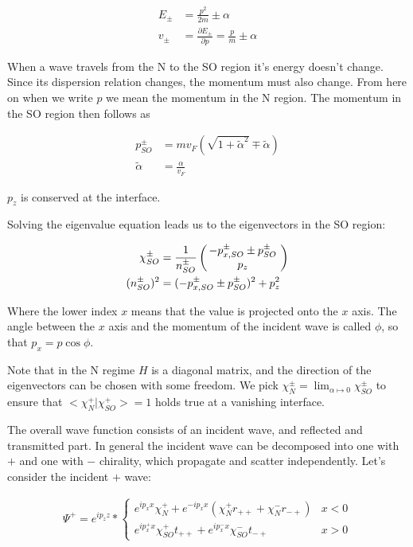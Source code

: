 \documentclass[11pt]{article}
\newcommand{\inp}[1]{\ensuremath{\left(#1\right)}}
\newcommand{\vect}[2]{\ensuremath{\inp{\hspace{-.8ex}\begin{array}{c}#1\\#2\end{array}\hspace{-.4ex}}}}
\newcommand{\ta}{\tilde \alpha}
\begin{document}
\begin{align}
    E_{\pm} &= \frac{p^2}{2m} \pm \alpha \\
    v_{\pm} &= \frac{\partial E_{\pm}}{\partial p} = \frac{p}{m} \pm \alpha
\end{align}

When a wave travels from the N to the SO region it's energy doesn't
change. Since its dispersion relation changes, the momentum must also
change. From here on when we write $p$ we mean the momentum in the N
region. The momentum in the SO region then follows as

\begin{align}
    \label{eq:pso}
    p_{SO}^{\pm} &= m v_F (\sqrt{1 + \ta^2} \mp \tilde \alpha) \\
    \tilde\alpha &= \frac{\alpha}{v_F}
\end{align}

$p_z$ is conserved at the interface.

Solving the eigenvalue equation leads us to the eigenvectors in the SO
region:

\begin{align*}
   \chi_{SO}^{\pm} &= \frac{1}{n_{SO}^{\pm}} 
                      \vect{-p_{x,SO}^{\pm} \pm p_{SO}^\pm}{p_z} \\
    (n_{SO}^{\pm})^2 &= (-p_{x,SO}^{\pm} \pm p_{SO}^\pm)^2 + p_z^2
\end{align*}

Where the lower index $x$ means that the value is projected onto the
$x$ axis. The angle between the $x$ axis and the momentum of the
incident wave is called $\phi$, so that $p_x = p \cos \phi$.

Note that in the N regime $H$ is a diagonal matrix, and the direction
of the eigenvectors can be chosen with some freedom. We pick
$\chi_N^{\pm} = \lim_{\alpha \mapsto 0} \chi_{SO}^{\pm}$ to ensure that
$<\chi_N^+|\chi_{SO}^+> = 1$ holds true at a vanishing interface.



The overall wave function consists of an incident wave, 
and reflected and transmitted part. In general the incident wave can
be decomposed into one with $+$ and one with $-$ chirality, which
propagate and scatter independently. Let's consider the incident $+$
wave:

\begin{align}
    \Psi^+ = e^{i p_z z} * \left\{
        \begin{array}{ll}
            e^{i p_x x} \chi_N^+ + e^{- i p_x x} (\chi_N^+ r_{++} +
                    \chi_N^- r_{-+})    & x < 0\\
            e^{i p_x^+ x} \chi_{SO}^+ t_{++} + e^{i p_x^- x}
            \chi_{SO}^- t_{-+}          & x > 0
        \end{array} \right.
\end{align}
\end{document}

